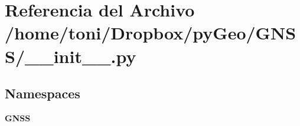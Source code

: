 \section{Referencia del Archivo /home/toni/\-Dropbox/py\-Geo/\-G\-N\-S\-S/\-\_\-\-\_\-init\-\_\-\-\_\-.py}
\label{GNSS_2____init_____8py}
\subsection*{Namespaces}
\begin{DoxyCompactItemize}
\item 
{\bf G\-N\-S\-S}
\end{DoxyCompactItemize}
